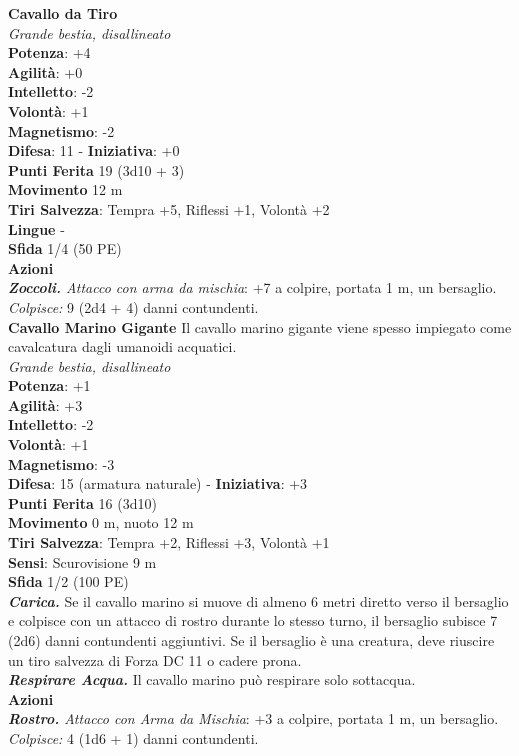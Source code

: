 \begin{multicols}{2}
\medskip\textbf{Cavallo da Tiro}\\
\emph{Grande bestia, disallineato}\\
\textbf{Potenza}: +4\\
\textbf{Agilità}: +0\\
\textbf{Intelletto}: -2\\
\textbf{Volontà}: +1\\
\textbf{Magnetismo}: -2\\
\textbf{Difesa}: 11 - \textbf{Iniziativa}: +0\\
\textbf{Punti Ferita} 19 (3d10 + 3)\\
\textbf{Movimento} 12 m\\
\textbf{Tiri Salvezza}:  Tempra +5, Riflessi +1, Volontà +2 \\
\textbf{Lingue} -\\
\textbf{Sfida} 1/4 (50 PE)\smallskip\\
\smallskip\textbf{Azioni}\\
\emph{\textbf{Zoccoli.} Attacco con arma da mischia}: +7 a colpire, portata 1 m, un bersaglio.\\
\emph{Colpisce:} 9 (2d4 + 4) danni contundenti.\\

\medskip\textbf{Cavallo Marino Gigante}
Il cavallo marino gigante viene spesso impiegato come cavalcatura dagli umanoidi acquatici.\\
\emph{Grande bestia, disallineato}\\
\textbf{Potenza}: +1\\
\textbf{Agilità}: +3\\
\textbf{Intelletto}: -2\\
\textbf{Volontà}: +1\\
\textbf{Magnetismo}: -3\\
\textbf{Difesa}: 15 (armatura naturale) - \textbf{Iniziativa}: +3\\
\textbf{Punti Ferita} 16 (3d10)\\
\textbf{Movimento} 0 m, nuoto 12 m\\
\textbf{Tiri Salvezza}: Tempra +2, Riflessi +3, Volontà +1 \\
\textbf{Sensi}: Scurovisione 9 m\\
\textbf{Sfida} 1/2 (100 PE)\smallskip\\
\emph{\textbf{Carica.}} Se il cavallo marino si muove di almeno 6 metri diretto verso il bersaglio e colpisce con un attacco di rostro durante lo stesso turno, il bersaglio subisce 7 (2d6) danni contundenti aggiuntivi. Se il bersaglio è una creatura, deve riuscire un tiro salvezza di Forza DC 11 o cadere prona.\\
\emph{\textbf{Respirare Acqua.}} Il cavallo marino può respirare solo sottacqua.\\
\smallskip\textbf{Azioni}\\
\emph{\textbf{Rostro.} Attacco con Arma da Mischia}: +3 a colpire, portata 1 m, un bersaglio.\\
\emph{Colpisce:} 4 (1d6 + 1) danni contundenti.\\


\end{multicols}
